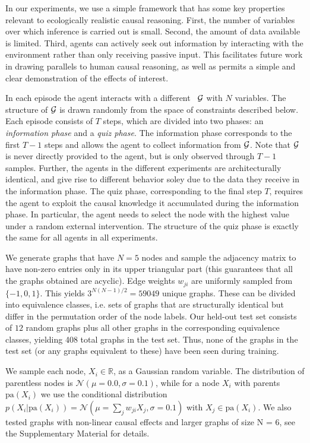 In our experiments, we use a simple framework that has some key properties relevant to ecologically realistic causal reasoning. First, the number of variables over which inference is carried out is small. Second, the amount of data available is limited. Third, agents can actively seek out information by interacting with the environment rather than only receiving passive input. This facilitates future work in drawing parallels to human causal reasoning, as well as permits a simple and clear demonstration of the effects of interest.

In each episode the agent interacts with a different \CBN~${\cal G}$ with $N$ variables. The structure of ${\cal G}$ is drawn randomly from the space of constraints described below. Each episode consists of $T$ steps, which are divided into two phases: an \emph{information phase} and a \emph{quiz phase}. The information phase corresponds to the first $T-1$ steps and allows the agent to collect information from ${\cal G}$. Note that ${\cal G}$ is never directly provided to the agent, but is only observed through $T-1$ samples. Further, the agents in the different experiments are architecturally identical, and give rise to different behavior soley due to the data they receive in the information phase. The quiz phase, corresponding to the final step $T$, requires the agent to exploit the causal knowledge it accumulated during the information phase. In particular, the agent needs to select the node with the highest value under a random external intervention. The structure of the quiz phase is exactly the same for all agents in all experiments.

We generate graphs that have $N=5$ nodes and sample the adjacency matrix to have non-zero entries only in its upper triangular part (this guarantees that all the graphs obtained are acyclic). Edge weights $w_{ji}$ are uniformly sampled from $\{-1, 0, 1\}$. This yields $3^{N(N - 1)/2}=59049$ unique graphs. These can be divided into equivalence classes, i.e. sets of graphs that are structurally identical but differ in the permutation order of the node labels. Our held-out test set consists of $12$ random graphs plus all other graphs in the corresponding equivalence classes, yielding 408 total graphs in the test set. Thus, none of the graphs in the test set (or any graphs equivalent to these) have been seen during training.

We sample each node, $X_i \in \mathbb{R}$, as a Gaussian random variable. The distribution of parentless nodes is $\mathcal{N}(\mu=0.0, \sigma=0.1)$, while for a node $X_i$ with parents $\textrm{pa}(X_{i})$ we use the conditional distribution $p(X_i \vert \textrm{pa}(X_{i})) = \mathcal{N}(\mu=\sum_{j} w_{ji}X_{j}, \sigma=0.1)$ with $X_j \in \textrm{pa}(X_{i})$. We also tested graphs with non-linear causal effects and larger graphs of size N = 6, see the Supplementary Material for details. %

